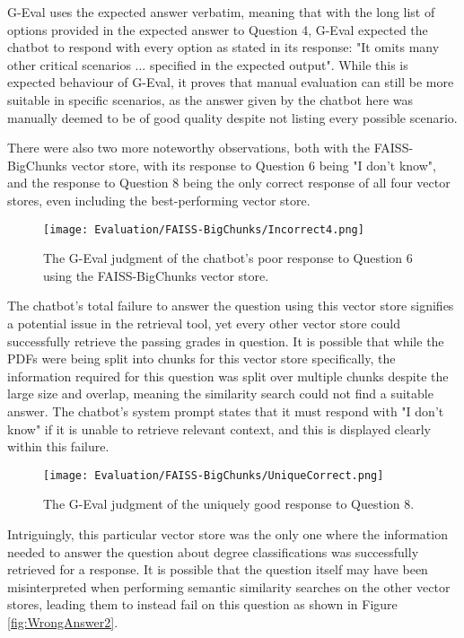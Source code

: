\noindent G-Eval uses the expected answer verbatim, meaning that with the long list of options provided in the expected answer to Question 4, 
G-Eval expected the chatbot to respond with every option as stated in its response: "It omits many other critical scenarios ... specified in the expected output". While this is expected behaviour of G-Eval, it proves that manual evaluation can still 
be more suitable in specific scenarios, as the answer given by the chatbot here was manually deemed to be of good quality despite not listing 
every possible scenario.

\para There were also two more noteworthy observations, both with the FAISS-BigChunks vector store, with its response to Question 6 being 
"I don't know", and the response to Question 8 being the only correct response of all four vector stores, even including the best-performing
vector store.

\begin{figure}[H]
    \centering
    \texttt{[image: Evaluation/FAISS-BigChunks/Incorrect4.png]}
    \caption{The G-Eval judgment of the chatbot's poor response to Question 6 using the FAISS-BigChunks vector store. \label{fig:ChatbotIDK}}
\end{figure}

\noindent The chatbot's total failure to answer the question using this vector store signifies a potential issue in the retrieval tool, yet every 
other vector store could successfully retrieve the passing grades in question. It is possible that while the PDFs were being split into chunks 
for this vector store specifically, the information required for this question was split over multiple chunks despite the large size and overlap,
meaning the similarity search could not find a suitable answer. The chatbot's system prompt states that it must respond with "I don't know" if it 
is unable to retrieve relevant context, and this is displayed clearly within this failure.

\begin{figure}[H]
    \centering
    \texttt{[image: Evaluation/FAISS-BigChunks/UniqueCorrect.png]}
    \caption{The G-Eval judgment of the uniquely good response to Question 8. \label{fig:UniqueCorrect}}
\end{figure}

\noindent Intriguingly, this particular vector store was the only one where the information needed to answer the question about degree classifications 
was successfully retrieved for a response. It is possible that the question itself may have been misinterpreted when performing semantic similarity searches on the other vector stores, leading them to instead fail on this question as shown in Figure \ref{fig:WrongAnswer2}.

